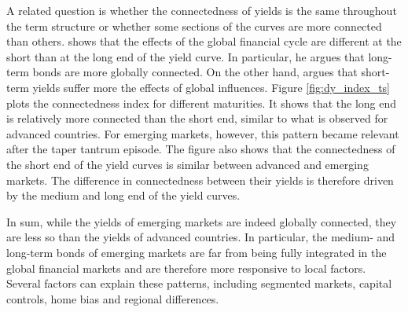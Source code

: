 {%
A related question is whether the connectedness of yields is the same throughout the term structure or whether some sections of the curves are more connected than others.
\cite{Obstfeld:2015} shows that the effects of the global financial cycle are different at the short than at the long end of the yield curve. In particular, he argues that long-term bonds are more globally connected.
On the other hand, \cite{Kalemli-Ozcan:2019} argues that short-term yields suffer more the effects of global influences.
Figure \ref{fig:dy_index_ts} plots the connectedness index for different maturities.
It shows that the long end is relatively more connected than the short end, similar to what is observed for advanced countries.
For emerging markets, however, this pattern became relevant after the taper tantrum episode.
The figure also shows that the connectedness of the short end of the yield curves is similar between advanced and emerging markets.
The difference in connectedness between their yields is therefore driven by the medium and long end of the yield curves.

In sum, while the yields of emerging markets are indeed globally connected, they are less so than the yields of advanced countries. 
In particular, the medium- and long-term bonds of emerging markets are far from being fully integrated in the global financial markets and are therefore more responsive to local factors.
Several factors can explain these patterns, including segmented markets, capital controls, home bias and regional differences.


}
